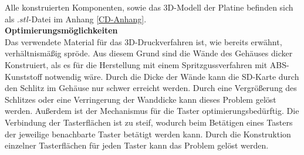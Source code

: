 Alle konstruierten Komponenten, sowie das 3D-Modell der Platine befinden sich als $.stl$-Datei im Anhang \ref{CD-Anhang}.\\
\newline
\textbf{Optimierungsmöglichkeiten}\\
Das verwendete Material für das 3D-Druckverfahren ist, wie bereits erwähnt, verhältnismäßig spröde. Aus diesem Grund sind die Wände des Gehäuses dicker Konstruiert, als es für die Herstellung mit einem Spritzgussverfahren mit ABS-Kunststoff notwendig wäre. Durch die Dicke der Wände kann die SD-Karte durch den Schlitz im Gehäuse nur schwer erreicht werden. Durch eine Vergrößerung des Schlitzes oder eine Verringerung der Wanddicke kann dieses Problem gelöst werden. Außerdem ist der Mechanismus für die Taster optimierungsbedürftig. Die Verbindung der Tasterflächen ist zu steif, wodurch beim Betätigen eines Tasters der jeweilige benachbarte Taster betätigt werden kann. Durch die Konstruktion einzelner Tasterflächen für jeden Taster kann das Problem gelöst werden. 